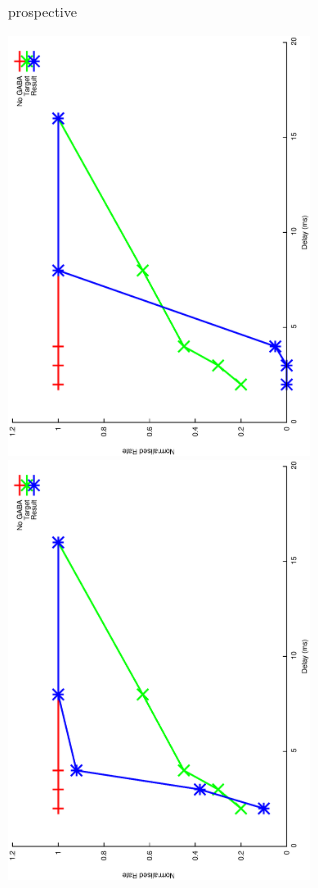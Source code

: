 \documentclass{article}
\begin{document}
prospective

\includegraphics[keepaspectratio=true,angle=-90,width=0.6\textwidth]{DS_ClickRecovery_result.0.eps}\clearpage
\includegraphics[keepaspectratio=true,angle=-90,width=0.6\textwidth]{DS_ClickRecovery_result.1.eps}\clearpage
\end{document}
